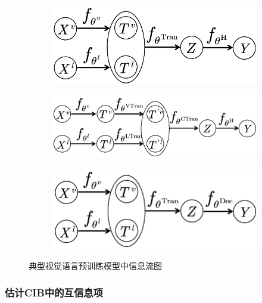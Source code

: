 \begin{figure}[!t]
\begin{subfigure}[b]{0.29\textwidth}
\centering
\includegraphics[width=1.0\linewidth]{figure/c4_trans_1.pdf}
\label{fig:c4_cib_1}
\end{subfigure}
\begin{subfigure}[b]{0.37\textwidth}
\centering
\includegraphics[width=1.0\linewidth]{figure/c4_trans_2.pdf}
\label{fig:c4_cib_2}
\end{subfigure}
\begin{subfigure}[b]{0.29\textwidth}
\centering
\includegraphics[width=1.0\linewidth]{figure/c4_trans_3.pdf}
\label{fig:c4_cib_3}
\end{subfigure}
\caption{典型视觉语言预训练模型中信息流图
}
\label{fig:c4_cib}
\end{figure}


\subsubsection{估计CIB中的互信息项}


